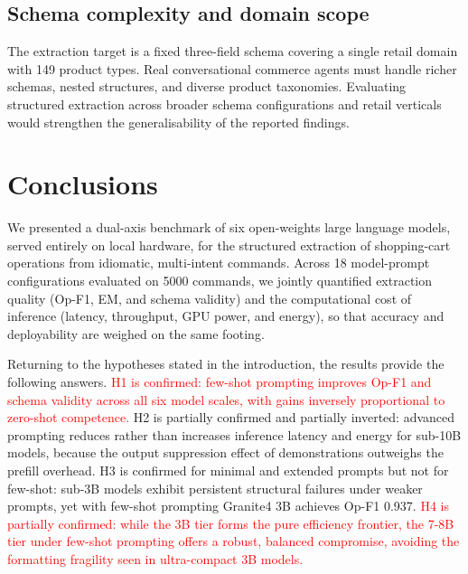 \documentclass[journal,article,submit,pdftex,moreauthors]{Definitions/mdpi}
\begin{document}
\subsection{Schema complexity and domain scope}
The extraction target is a fixed three-field schema covering a single retail domain with 149 product types. Real conversational commerce agents must handle richer schemas, nested structures, and diverse product taxonomies. Evaluating structured extraction across broader schema configurations and retail verticals would strengthen the generalisability of the reported findings.


\section{Conclusions}

We presented a dual-axis benchmark of six open-weights large language models, served entirely on local hardware, for the structured extraction of shopping-cart operations from idiomatic, multi-intent commands. Across 18 model-prompt configurations evaluated on 5000 commands, we jointly quantified extraction quality (Op-F1, EM, and schema validity) and the computational cost of inference (latency, throughput, GPU power, and energy), so that accuracy and deployability are weighed on the same footing.

Returning to the hypotheses stated in the introduction, the results provide the following answers.
\textcolor{red}{H1 is confirmed: few-shot prompting improves Op-F1 and schema validity across all six model scales, with gains inversely proportional to zero-shot competence.}
H2 is partially confirmed and partially inverted: advanced prompting reduces rather than increases inference latency and energy for sub-10B models, because the output suppression effect of demonstrations outweighs the prefill overhead.
H3 is confirmed for minimal and extended prompts but not for few-shot: sub-3B models exhibit persistent structural failures under weaker prompts, yet with few-shot prompting Granite4 3B achieves Op-F1 0.937.
\textcolor{red}{H4 is partially confirmed: while the 3B tier forms the pure efficiency frontier, the 7-8B tier under few-shot prompting offers a robust, balanced compromise, avoiding the formatting fragility seen in ultra-compact 3B models.}
\end{document}
